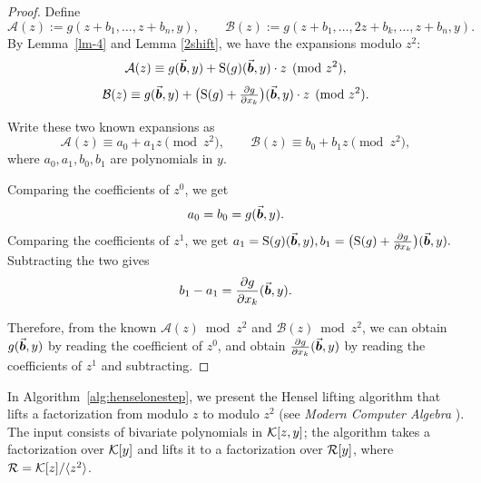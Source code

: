 \documentclass{article}
\numberwithin{equation}{section}
\begin{document}
\begin{proof}
Define
\[
\mathcal{A}(z) := g(z+b_1,\dots,z+b_n,y), \qquad
\mathcal{B}(z) := g(z+b_1,\dots,2z+b_k,\dots,z+b_n,y).
\]
By Lemma~\ref{lm-4} and Lemma \ref{2shift}, we have the expansions modulo $z^2$:
\[
\mathcal{A}(z) \equiv g(\vec{\boldsymbol{b}},y) + {\rm S}(g)(\vec{\boldsymbol{b}},y) \cdot z \pmod{z^2},
\]
\[
\mathcal{B}(z) \equiv g(\vec{\boldsymbol{b}},y) + \bigl({\rm S}(g)+\tfrac{\partial g}{\partial x_k}\bigr)(\vec{\boldsymbol{b}},y) \cdot z \pmod{z^2}.
\]

Write these two known expansions as
\[
\mathcal{A}(z) \equiv a_0 + a_1 z \pmod{z^2}, \qquad
\mathcal{B}(z) \equiv b_0 + b_1 z \pmod{z^2},
\]
where $a_0, a_1, b_0, b_1$ are polynomials in $y$.

Comparing the coefficients of $z^0$, we get
%
$$a_0 = b_0 = g(\vec{\boldsymbol{b}},y).$$
%
Comparing the coefficients of $z^1$, we get
%
$a_1 = {\rm S}(g)(\vec{\boldsymbol{b}},y), b_1 = \bigl({\rm S}(g)+\tfrac{\partial g}{\partial x_k}\bigr)(\vec{\boldsymbol{b}},y).$
%
Subtracting the two gives
\[
b_1 - a_1 = \frac{\partial g}{\partial x_k}(\vec{\boldsymbol{b}},y).
\]

Therefore, from the known $\mathcal{A}(z) \bmod z^2$ and $\mathcal{B}(z) \bmod z^2$, we can obtain $g(\vec{\boldsymbol{b}},y)$ by reading the coefficient of $z^0$, and obtain $\frac{\partial g}{\partial x_k}(\vec{\boldsymbol{b}},y)$ by reading the coefficients of $z^1$ and subtracting.
\end{proof}




In Algorithm~\ref{alg:henselonestep}, we present the Hensel lifting algorithm that lifts a factorization from modulo $z$ to modulo $z^2$ (see \textit{Modern Computer Algebra} \cite{vonzurGathen2013}). The input consists of bivariate polynomials in ${\mathcal{K}}[z,y]$; the algorithm takes a factorization over ${\mathcal{K}}[y]$ and lifts it to a factorization over ${\mathcal{R}}[y]$, where ${\mathcal{R}}={\mathcal{K}}[z]/\langle z^2\rangle$.
 
\end{document}
